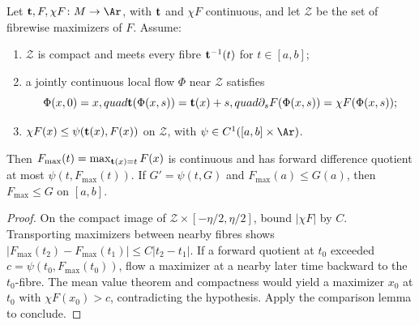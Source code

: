 \begin{lemma}
\label{lem:forward-difference-maximum-flow}
\leanok



Let ${\bf t},F,\chi F\colon M\to\Ar$, with ${\bf t}$ and $\chi F$
continuous, and let $\mathcal Z$ be the set of fibrewise maximizers of
$F$. Assume:
\begin{enumerate}
\item $\mathcal Z$ is compact and meets every fibre
${\bf t}^{-1}(t)$ for $t\in[a,b]$;
\item a jointly continuous local flow $\Phi$ near $\mathcal Z$ satisfies
$$\Phi(x,0)=x,quad {\bf t}(\Phi(x,s))={\bf t}(x)+s,quad
\partial_sF(\Phi(x,s))=\chi F(\Phi(x,s));$$
\item $\chi F(x)\le\psi({\bf t}(x),F(x))$ on $\mathcal Z$, with
$\psi\in C^1([a,b]\times\Ar)$.
\end{enumerate}
Then $F_{\max}(t)=\max_{{\bf t}(x)=t}F(x)$ is continuous and has
forward difference quotient at most $\psi(t,F_{\max}(t))$. If
$G'=\psi(t,G)$ and $F_{\max}(a)\le G(a)$, then
$F_{\max}\le G$ on $[a,b]$.
\end{lemma}
\begin{proof}
\sketch
\leanok
{}
On the compact image of
$\mathcal Z\times[-\eta/2,\eta/2]$, bound $|\chi F|$ by $C$.
Transporting maximizers between nearby fibres shows
$|F_{\max}(t_2)-F_{\max}(t_1)|\le C|t_2-t_1|$. If a forward quotient
at $t_0$ exceeded $c=\psi(t_0,F_{\max}(t_0))$, flow a maximizer at a
nearby later time backward to the $t_0$-fibre. The mean value theorem
and compactness would yield a maximizer $x_0$ at $t_0$ with
$\chi F(x_0)>c$, contradicting the hypothesis. Apply the comparison
lemma to conclude.
\end{proof}

